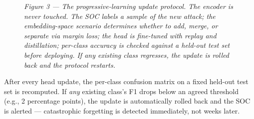 \documentclass[11pt,a4paper]{article}
\begin{document}
\begin{figure}[H]
\caption*{\small\textit{Figure 3 --- The progressive-learning update protocol. The encoder is never touched. The SOC labels a sample of the new attack; the embedding-space scenario determines whether to add, merge, or separate via margin loss; the head is fine-tuned with replay and distillation; per-class accuracy is checked against a held-out test set before deploying. If any existing class regresses, the update is rolled back and the protocol restarts.}}
\end{figure}

After every head update, the per-class confusion matrix on a fixed held-out test set is recomputed. If \emph{any} existing class's F1 drops below an agreed threshold (e.g., 2 percentage points), the update is automatically rolled back and the SOC is alerted --- catastrophic forgetting is detected immediately, not weeks later.
\end{document}
